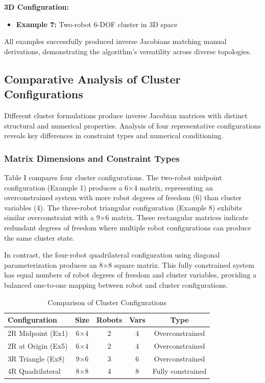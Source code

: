 \documentclass[lettersize,journal]{IEEEtran}
\begin{document}
\textbf{3D Configuration:}
\begin{itemize}
\item \textbf{Example 7:} Two-robot 6-DOF cluster in 3D space
\end{itemize}

All examples successfully produced inverse Jacobians matching manual derivations, demonstrating the algorithm's versatility across diverse topologies.

\subsection{Comparative Analysis of Cluster Configurations}

Different cluster formulations produce inverse Jacobian matrices with distinct structural and numerical properties. Analysis of four representative configurations reveals key differences in constraint types and numerical conditioning.

\subsubsection{Matrix Dimensions and Constraint Types}

Table I compares four cluster configurations. The two-robot midpoint configuration (Example 1) produces a 6×4 matrix, representing an overconstrained system with more robot degrees of freedom (6) than cluster variables (4). The three-robot triangular configuration (Example 8) exhibits similar overconstraint with a 9×6 matrix. These rectangular matrices indicate redundant degrees of freedom where multiple robot configurations can produce the same cluster state.

In contrast, the four-robot quadrilateral configuration using diagonal parameterization produces an 8×8 square matrix. This fully constrained system has equal numbers of robot degrees of freedom and cluster variables, providing a balanced one-to-one mapping between robot and cluster configurations.

\begin{table}[h]
\centering
\caption{Comparison of Cluster Configurations}
\begin{tabular}{|l|c|c|c|c|}
\hline
\textbf{Configuration} & \textbf{Size} & \textbf{Robots} & \textbf{Vars} & \textbf{Type} \\
\hline
2R Midpoint (Ex1) & 6×4 & 2 & 4 & Overconstrained \\
2R at Origin (Ex5) & 6×4 & 2 & 4 & Overconstrained \\
3R Triangle (Ex8) & 9×6 & 3 & 6 & Overconstrained \\
4R Quadrilateral & 8×8 & 4 & 8 & Fully constrained \\
\hline
\end{tabular}
\end{table}
\end{document}
